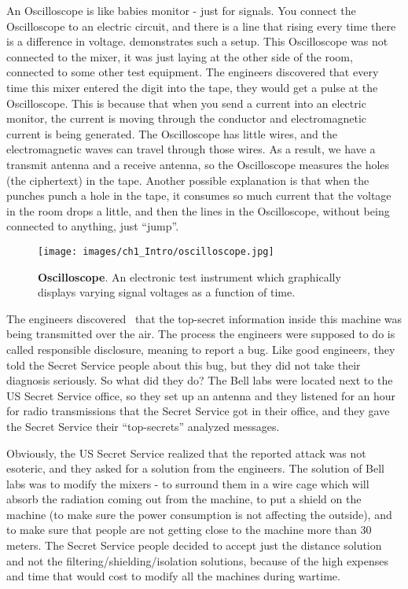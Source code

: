 An Oscilloscope is like babies monitor - just for signals. You connect the
Oscilloscope to an electric circuit, and there is a line that rising every time
there is a difference in voltage.  demonstrates such a setup.
This Oscilloscope was not connected to the mixer, it was just laying at the other
side of the room, connected to some other test equipment. The engineers
discovered that every time this mixer entered the digit into the tape, they would
get a pulse at the Oscilloscope. This is because that when you send a current into an electric monitor, the current is moving through the conductor and electromagnetic current is being generated. The Oscilloscope has little wires, and the electromagnetic
waves can travel through those wires. As a result, we have a transmit antenna and
a receive antenna, so the Oscilloscope measures the holes (the ciphertext) in
the tape. Another possible explanation is that when the punches punch a hole in the
tape, it consumes so much current that the voltage in the room drops a little,
and then the lines in the Oscilloscope, without being connected to anything,
just ``jump''.

\begin{figure}
    \centering
    \texttt{[image: images/ch1\_Intro/oscilloscope.jpg]}
    \caption{\textbf{Oscilloscope}. An electronic test instrument which graphically displays varying signal voltages as a function of time.}
    \label{fig:Oscillo}
\end{figure}

The engineers discovered~\cite{NSAsecret} that the top-secret information inside
this machine was being transmitted over the air. The process the engineers were
supposed to do is called responsible disclosure, meaning to report a bug. Like
good engineers, they told the Secret Service people about this bug, but they
did not take their diagnosis seriously. So what did they do? The Bell labs were
located next to the US Secret Service office, so they set up an antenna and
they listened for an hour for radio transmissions that the Secret Service got in
their office, and they gave the Secret Service their ``top-secrets'' analyzed
messages.

Obviously, the US Secret Service realized that the reported attack was not
esoteric, and they asked for a solution from the engineers. The solution of Bell
labs was to modify the mixers - to surround them in a wire cage which will
absorb the radiation coming out from the machine, to put a shield on the
machine (to make sure the power consumption is not affecting the outside), and
to make sure that people are not getting close to the machine more than 30
meters. The Secret Service people decided to accept just the distance solution
and not the filtering/shielding/isolation solutions, because of the high
expenses and time that would cost to modify all the machines during wartime.


